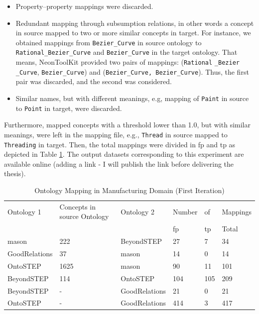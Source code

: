 \begin{itemize}
	
	\item Property–property mappings were discarded.  
	
	\item Redundant mapping through subsumption relations, in other words a concept in source mapped to two or more similar concepts in target. For instance, we obtained mappings  from \texttt{Bezier\_Curve} in source ontology to \texttt{Rational\_Bezier\_Curve} and \texttt{Bezier\_Curve} in the target ontology. That means, NeonToolKit provided two pairs of mappings: (\texttt{Rational} \texttt{\_Bezier} \texttt{\_Curve}, \texttt{Bezier\_Curve}) and (\texttt{Bezier\_Curve, Bezier\_Curve}). Thus, the first pair was discarded, and the second was considered.
	
	\item Similar names, but with different meanings, e.g, mapping of \texttt{Paint} in source to \texttt{Point} in target, were discarded.
	
\end{itemize}


Furthermore, mapped concepts with a threshold lower than 1.0, but with similar meanings, were left in the mapping file, e.g., \texttt{Thread} in source mapped to \texttt{Threading} in target. Then, the total mappings were divided in \gls{fp} and \gls{tp} as depicted in Table \ref{table4.4}. The  output datasets corresponding to this experiment are available online (adding a link - I will publish the link before delivering the thesis).  


\begin{table}[tp]%
	
	\caption{Ontology Mapping in Manufacturing Domain (First Iteration)}
	\label{table4.4}\centering
	\begin{tabular}{p{2.5cm} p{2cm} p{2.5cm} p{1.5cm} p{1cm} p{1.5cm}}\toprule
		
		Ontology 1 & Concepts in source Ontology &	Ontology 2	& Number & of & Mappings
		
		\\\cline{4-6}
		
		&	&	& \gls{fp} & \gls{tp} & Total  \\\toprule
		\gls{mason} &	222 &	BeyondSTEP  &	27 &	7&	34 \\\toprule
		GoodRelations&	37&	\gls{mason}&	14&	0&	14 \\\toprule
		OntoSTEP &	1625&	\gls{mason}&	90&	11&	101 \\\toprule
		BeyondSTEP	&114&	OntoSTEP&	104	&105&	209 \\\toprule
		BeyondSTEP  &			-&	GoodRelations&	21	&0&	21 \\\toprule
		OntoSTEP&	-&	GoodRelations&	414&	3&	417\\\toprule
	\end{tabular}
	
\end{table}





